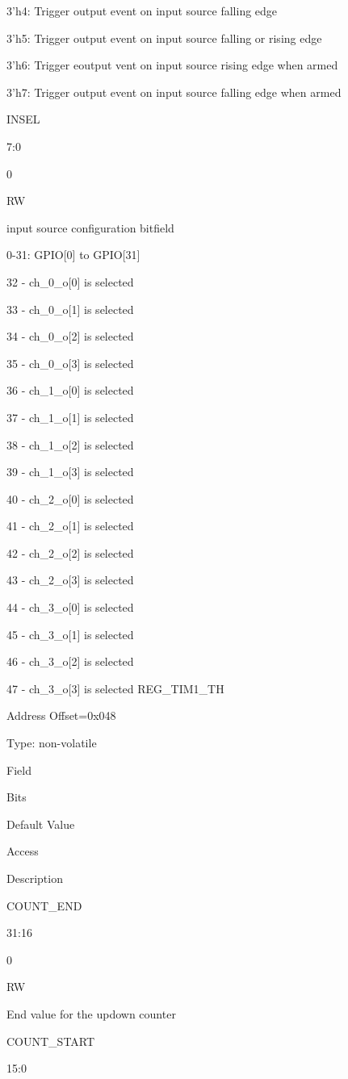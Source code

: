3’h4: Trigger output event on input source falling edge

3’h5: Trigger output event on input source falling or rising edge

3’h6: Trigger eoutput vent on input source rising edge when armed

3’h7: Trigger output event on input source falling edge when armed

INSEL
	

7:0
	

0
	

RW
	

input source configuration bitfield

0-31: GPIO[0] to GPIO[31]

32 - ch_0_o[0] is selected

33 - ch_0_o[1] is selected

34 - ch_0_o[2] is selected

35 - ch_0_o[3] is selected

36 - ch_1_o[0] is selected

37 - ch_1_o[1] is selected

38 - ch_1_o[2] is selected

39 - ch_1_o[3] is selected

40 - ch_2_o[0] is selected

41 - ch_2_o[1] is selected

42 - ch_2_o[2] is selected

43 - ch_2_o[3] is selected

44 - ch_3_o[0] is selected

45 - ch_3_o[1] is selected

46 - ch_3_o[2] is selected

47 - ch_3_o[3] is selected
REG_TIM1_TH

    Address Offset=0x048

    Type: non-volatile

Field
	

Bits
	

Default Value
	

Access
	

Description

COUNT_END
	

31:16
	

0
	

RW
	

End value for the updown counter

COUNT_START
	

15:0
	

